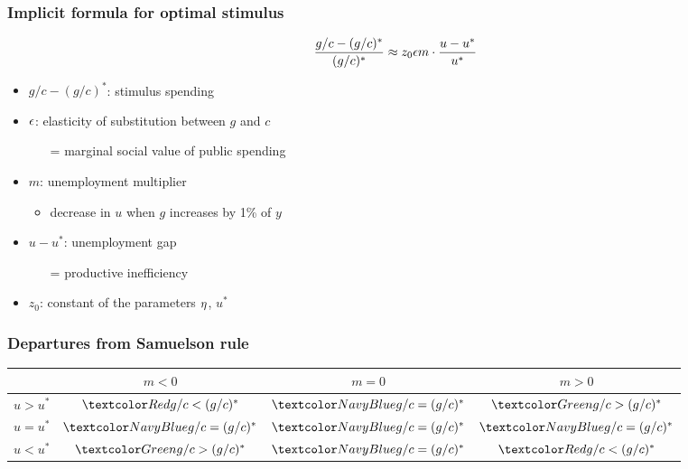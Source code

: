 \documentclass[12pt,xcolor={dvipsnames},hyperref={pdftex,pdfpagemode=UseNone,hidelinks,pdfdisplaydoctitle=true},usepdftitle=false]{beamer}
\begin{document}
\begin{frame}
\frametitle{Implicit formula for optimal stimulus}
\vspace{-1cm}
\begin{equation*}
\frac{g/c-(g/c)^{*}}{(g/c)^{*}} \approx z_0 \epsilon m \cdot \frac{u-u^{*}}{u^{*}}
\end{equation*}
\vspace{-0.5cm}
\begin{itemize}
\item $g/c-(g/c)^{*}$: stimulus spending 
\item $\epsilon$: elasticity of substitution between $g$ and $c$
\begin{itemize}
\item[=] marginal social value of public spending
\end{itemize}
\item $m$: unemployment multiplier
\begin{itemize}
	\item decrease in $u$ when $g$ increases by 1\% of $y$
\end{itemize}
\item $u-u^{*}$: unemployment gap
\begin{itemize}
\item[=] productive inefficiency 
\end{itemize}
\item $z_0$: constant of the parameters $\eta$, $u^*$
\end{itemize}
\end{frame}


\begin{frame}
\frametitle{Departures from Samuelson rule}
\begin{table}
\begin{tabular*}{\textwidth}{@{\extracolsep\fill}lccc}
 & $m < 0$ & $m = 0$ & $m > 0$\\
\toprule
$u>u^{*}$  & $\ral{g/c<(g/c)^{*}}$  & $\bal{g/c=(g/c)^{*}}$ & $\gal{g/c>(g/c)^{*}}$ \\
$u=u^{*}$ & $\bal{g/c=(g/c)^{*}}$ & $\bal{g/c=(g/c)^{*}}$  & $\bal{g/c=(g/c)^{*}}$ \\ 
$u<u^{*}$ & $\gal{g/c>(g/c)^{*}}$ & $\bal{g/c=(g/c)^{*}}$ & $\ral{g/c<(g/c)^{*}}$ \\ 
\bottomrule
\end{tabular*}
\end{table}
\end{frame}
\end{document}
